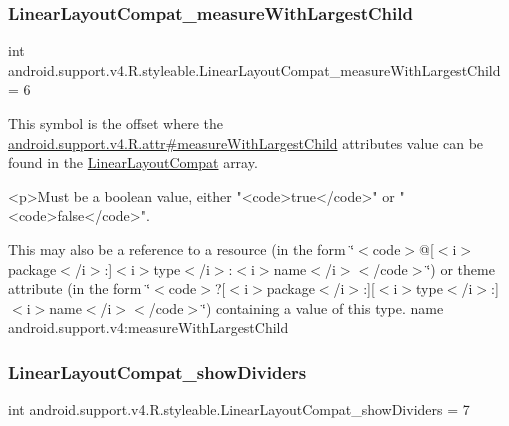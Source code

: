 \subsubsection{\texorpdfstring{Linear\+Layout\+Compat\+\_\+measure\+With\+Largest\+Child}{LinearLayoutCompat\_measureWithLargestChild}}
{\footnotesize\ttfamily int android.\+support.\+v4.\+R.\+styleable.\+Linear\+Layout\+Compat\+\_\+measure\+With\+Largest\+Child = 6\hspace{0.3cm}{\ttfamily [static]}}

This symbol is the offset where the \hyperlink{classandroid_1_1support_1_1v4_1_1R_1_1attr_a3fab112fbf63d1e882afbe1b156b4cb0}{android.\+support.\+v4.\+R.\+attr\#measure\+With\+Largest\+Child} attribute\textquotesingle{}s value can be found in the \hyperlink{classandroid_1_1support_1_1v4_1_1R_1_1styleable_a5410acb05d349e2b35bd2dbadc93b229}{Linear\+Layout\+Compat} array.

\begin{DoxyVerb}      <p>Must be a boolean value, either "<code>true</code>" or "<code>false</code>".
\end{DoxyVerb}
 

This may also be a reference to a resource (in the form \char`\"{}$<$code$>$@\mbox{[}$<$i$>$package$<$/i$>$\+:\mbox{]}$<$i$>$type$<$/i$>$\+:$<$i$>$name$<$/i$>$$<$/code$>$\char`\"{}) or theme attribute (in the form \char`\"{}$<$code$>$?\mbox{[}$<$i$>$package$<$/i$>$\+:\mbox{]}\mbox{[}$<$i$>$type$<$/i$>$\+:\mbox{]}$<$i$>$name$<$/i$>$$<$/code$>$\char`\"{}) containing a value of this type.  name android.\+support.\+v4\+:measure\+With\+Largest\+Child \mbox{\label{classandroid_1_1support_1_1v4_1_1R_1_1styleable_abca207974c64d98f9f476c69a829e50e}} 
\subsubsection{\texorpdfstring{Linear\+Layout\+Compat\+\_\+show\+Dividers}{LinearLayoutCompat\_showDividers}}
{\footnotesize\ttfamily int android.\+support.\+v4.\+R.\+styleable.\+Linear\+Layout\+Compat\+\_\+show\+Dividers = 7\hspace{0.3cm}{\ttfamily [static]}}

